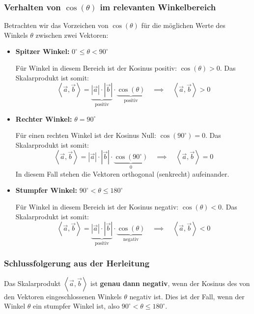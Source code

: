 \subsubsection*{Verhalten von $\cos(\theta)$ im relevanten Winkelbereich}
Betrachten wir das Vorzeichen von $\cos(\theta)$ für die möglichen Werte des Winkels $\theta$ zwischen zwei Vektoren:
\begin{itemize}
    \item \textbf{Spitzer Winkel:} $0^\circ \le \theta < 90^\circ$
    
    Für Winkel in diesem Bereich ist der Kosinus positiv: $\cos(\theta) > 0$.
    Das Skalarprodukt ist somit:
    $$ \left\langle \vec{a}, \vec{b} \right\rangle = \underbrace{|\vec{a}| \cdot |\vec{b}|}_{\text{positiv}} 
    \cdot \underbrace{\cos(\theta)}_{\text{positiv}} \quad \implies \quad \left\langle \vec{a}, \vec{b} 
    \right\rangle > 0 $$
    
    \item \textbf{Rechter Winkel:} $\theta = 90^\circ$
    
    Für einen rechten Winkel ist der Kosinus Null: $\cos(90^\circ) = 0$.
    Das Skalarprodukt ist somit:
    $$ \left\langle \vec{a}, \vec{b} \right\rangle = |\vec{a}| \cdot |\vec{b}| \cdot 
    \underbrace{\cos(90^\circ)}_{0} \quad \implies \quad \left\langle \vec{a}, \vec{b} \right\rangle = 0 $$
    In diesem Fall stehen die Vektoren orthogonal (senkrecht) aufeinander.
    
    \item \textbf{Stumpfer Winkel:} $90^\circ < \theta \le 180^\circ$
    
    Für Winkel in diesem Bereich ist der Kosinus negativ: $\cos(\theta) < 0$.
    Das Skalarprodukt ist somit:
    $$ \left\langle \vec{a}, \vec{b} \right\rangle = \underbrace{|\vec{a}| \cdot |\vec{b}|}_{\text{positiv}} 
    \cdot \underbrace{\cos(\theta)}_{\text{negativ}} \quad \implies \quad \left\langle \vec{a}, \vec{b} 
    \right\rangle < 0 $$
\end{itemize}

\subsubsection*{Schlussfolgerung aus der Herleitung}
Das Skalarprodukt $\left\langle \vec{a}, \vec{b} \right\rangle$ ist \textbf{genau dann negativ}, wenn der 
Kosinus des von den Vektoren eingeschlossenen Winkels $\theta$ negativ ist. Dies ist der Fall, wenn der 
Winkel $\theta$ ein stumpfer Winkel ist, also $90^\circ < \theta \le 180^\circ$.